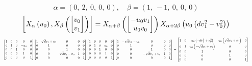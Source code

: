\documentclass[11pt]{article}
\theoremstyle{definition}
\begin{document}
\[
\alpha = \left( 0, \  2, \  0, \  0, \  0\right), \quad \beta = \left( 1, \  -1, \  0, \  0, \  0\right)
\]
\[
\scaletoalign{\textwidth}{\left[ X_{\alpha}\left(u_{0}\right), X_{\beta}\left(\left[\begin{matrix}v_{0}\\v_{1}\end{matrix}\right]\right) \right] = X_{\alpha + \beta}\left(\left[\begin{matrix}- u_{0} v_{1}\\u_{0} v_{0}\end{matrix}\right]\right) X_{\alpha + 2\beta}\left(u_{0} \left(d v_{1}^{2} - v_{0}^{2}\right)\right)}
\]
\[
\scaletoalign{\textwidth}{{\left[\begin{matrix}1 & 0 & 0 & 0 & 0\\0 & 1 & 0 & - u_{0} & 0\\0 & 0 & 1 & 0 & 0\\0 & 0 & 0 & 1 & 0\\0 & 0 & 0 & 0 & 1\end{matrix}\right]} {\left[\begin{matrix}1 & \sqrt{d} v_{1} + v_{0} & 0 & 0 & 0\\0 & 1 & 0 & 0 & 0\\0 & 0 & 1 & 0 & 0\\0 & 0 & \sqrt{d} v_{1} - v_{0} & 1 & 0\\0 & 0 & 0 & 0 & 1\end{matrix}\right]} {\left[\begin{matrix}1 & 0 & 0 & 0 & 0\\0 & 1 & 0 & u_{0} & 0\\0 & 0 & 1 & 0 & 0\\0 & 0 & 0 & 1 & 0\\0 & 0 & 0 & 0 & 1\end{matrix}\right]} {\left[\begin{matrix}1 & - \sqrt{d} v_{1} - v_{0} & 0 & 0 & 0\\0 & 1 & 0 & 0 & 0\\0 & 0 & 1 & 0 & 0\\0 & 0 & - \sqrt{d} v_{1} + v_{0} & 1 & 0\\0 & 0 & 0 & 0 & 1\end{matrix}\right]} = {\left[\begin{matrix}1 & 0 & u_{0} \left(- d v_{1}^{2} + v_{0}^{2}\right) & u_{0} \left(\sqrt{d} v_{1} + v_{0}\right) & 0\\0 & 1 & u_{0} \left(- \sqrt{d} v_{1} + v_{0}\right) & 0 & 0\\0 & 0 & 1 & 0 & 0\\0 & 0 & 0 & 1 & 0\\0 & 0 & 0 & 0 & 1\end{matrix}\right]}}
\]
\end{document}
